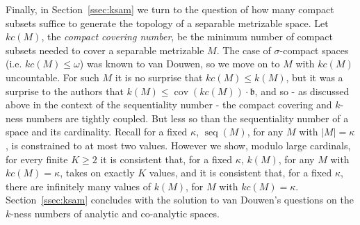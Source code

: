 \documentclass{article}
\begin{document}
Finally, in Section~\ref{ssec:ksam} we turn to the question of how many compact subsets suffice to generate the topology of a separable metrizable space. 
Let $kc(M)$, the \emph{compact covering number}, be the minimum number of compact subsets needed to cover a separable metrizable $M$. 
The case of $\sigma$-compact spaces (i.e. $kc(M) \le \omega$) was known to van Douwen, so we move on to  $M$ with $kc(M)$ uncountable.  
For such $M$ it is no surprise that $kc(M) \le k(M)$, but it was a surprise to the authors that $k(M) \le \mathop{cov}(kc(M))\cdot \mathfrak{b}$, and so - as discussed above in  the context of the sequentiality number - the compact covering and $k$-ness numbers are tightly coupled. But less so than the sequentiality number of a space and its cardinality. 
Recall for a fixed $\kappa$, $\mathop{seq}(M)$, for  any $M$ with $|M|=\kappa$, is constrained to at most two values. However we show, modulo large cardinals, for every finite $K\ge 2$  it is consistent that,  for a fixed $\kappa$, $k(M)$, for  any $M$ with $kc(M)=\kappa$, takes on exactly $K$ values, and it is consistent that,  for a fixed $\kappa$, there are infinitely many values of $k(M)$, for   $M$ with $kc(M)=\kappa$. 
Section~\ref{ssec:ksam} concludes with the solution to van Douwen's questions on the $k$-ness numbers of analytic and co-analytic spaces.




\end{document}

